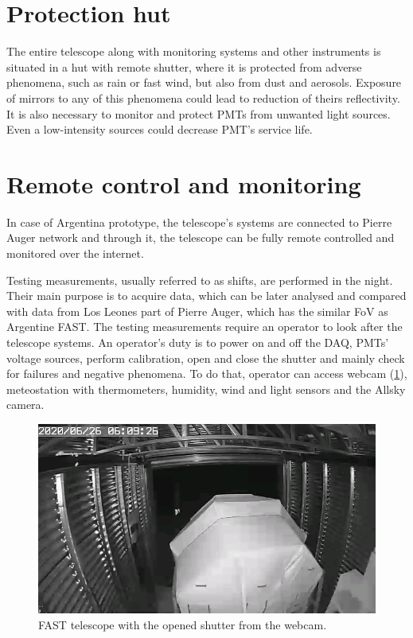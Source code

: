 \section{Protection hut}
The entire telescope along with monitoring systems and other instruments is situated in a hut with remote shutter, where it is protected from adverse phenomena, such as rain or fast wind, but also from dust and aerosols. Exposure of mirrors to any of this phenomena could lead to reduction of theirs reflectivity. It is also necessary to monitor and protect PMTs from unwanted light sources. Even a low-intensity sources could decrease PMT's service life.

\section{Remote control and monitoring}
In case of Argentina prototype, the telescope's systems are connected to Pierre Auger network and through it, the telescope can be fully remote controlled and monitored over the internet. 

\par
Testing measurements, usually referred to as shifts, are performed in the night. Their main purpose is to acquire data, which can be later analysed and compared with data from Los Leones part of Pierre Auger, which has the similar FoV as Argentine FAST. 
The testing measurements require an operator to look after the telescope systems. An operator's duty is to power on and off the DAQ, PMTs' voltage sources, perform calibration, open and close the shutter and mainly check for failures and negative phenomena. To do that, operator can access webcam (\ref{FASTCam}), meteostation with thermometers, humidity, wind and light sensors and the Allsky camera.

\begin{figure}[H]
 \centering
 \includegraphics[scale = 0.5]{./pictures/operatinFast}
 \caption{FAST telescope with the opened shutter from the webcam.}
 \label{FASTCam}
 
\end{figure}

